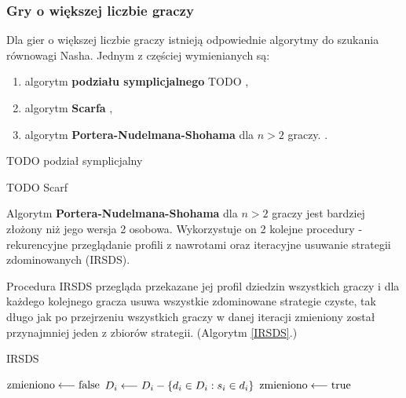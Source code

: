 \documentclass[polish]{standalone}
\begin{document}
\subsubsection{Gry o większej liczbie graczy}

Dla gier o większej liczbie graczy istnieją odpowiednie algorytmy do szukania równowagi Nasha. Jednym z częściej
wymienianych są:
\begin{enumerate}
\item algorytm \textbf{podziału symplicjalnego} TODO \cite{LTH-NE},
\item algorytm \textbf{Scarfa} \cite{SCARF-NR},
\item algorytm \textbf{Portera-Nudelmana-Shohama} dla $n > 2$ graczy. \cite{PNS-NE}.
\end{enumerate}

TODO podział symplicjalny

TODO Scarf

Algorytm \textbf{Portera-Nudelmana-Shohama} dla $n > 2$ graczy jest bardziej złożony niż jego wersja 2 osobowa.
Wykorzystuje on 2 kolejne procedury - rekurencyjne przeglądanie profili z nawrotami  oraz
iteracyjne usuwanie strategii zdominowanych  (IRSDS).

Procedura IRSDS przegląda przekazane jej profil dziedzin wszystkich graczy i dla każdego kolejnego gracza usuwa
wszystkie zdominowane strategie czyste, tak długo jak po przejrzeniu wszystkich graczy w danej iteracji zmieniony 
został przynajmniej jeden z zbiorów strategii. (Algorytm \ref*{IRSDS}.)

\begin{algorithm}
\caption{IRSDS}
\label{IRSDS}
\begin{algorithmic}
\REPEAT
 \STATE $\textrm{zmieniono} \longleftarrow \textrm{false}$
     \STATE $D_i \longleftarrow D_i - \{ d_i \in D_i: s_i \in d_i \}$
     \STATE $\textrm{zmieniono} \longleftarrow \textrm{true}$
     \ENDIF
    \ENDIF
   \ENDFOR 
  \ENDFOR
 \ENDFOR
{}
\end{algorithmic}
\end{algorithm}
\end{document}
